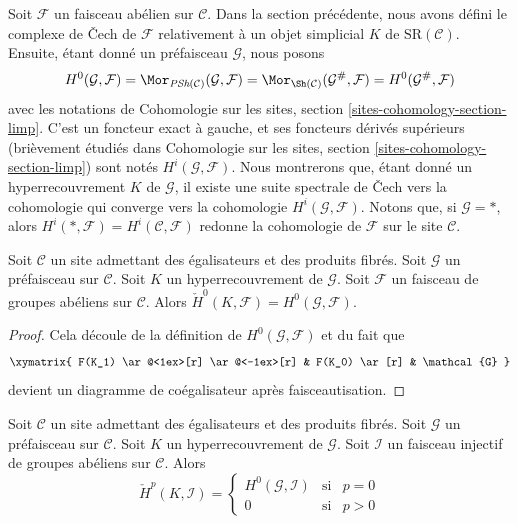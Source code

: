 \medskip\noindent
Soit $\mathcal{F}$ un faisceau abélien sur $\mathcal{C}$.
Dans la section précédente, nous avons défini le complexe de {\v C}ech de $\mathcal{F}$
relativement à un objet simplicial $K$ de $\text{SR}(\mathcal{C})$.
Ensuite, étant donné un préfaisceau $\mathcal{G}$, nous posons
$$
H^0(\mathcal{G}, \mathcal{F}) =
\Mor_{\textit{PSh}(\mathcal{C})}(\mathcal{G}, \mathcal{F}) =
\Mor_{\Sh(\mathcal{C})}(\mathcal{G}^\#, \mathcal{F}) =
H^0(\mathcal{G}^\#, \mathcal{F})
$$
avec les notations de
Cohomologie sur les sites, section \ref{sites-cohomology-section-limp}.
C'est un foncteur exact à gauche, et ses foncteurs dérivés supérieurs
(brièvement étudiés dans
Cohomologie sur les sites, section \ref{sites-cohomology-section-limp})
sont notés $H^i(\mathcal{G}, \mathcal{F})$.
Nous montrerons que, étant donné un hyperrecouvrement $K$ de $\mathcal{G}$,
il existe une suite spectrale de {\v C}ech vers la cohomologie qui converge vers la
cohomologie $H^i(\mathcal{G}, \mathcal{F})$.
Notons que, si $\mathcal{G} = *$, alors
$H^i(*, \mathcal{F}) = H^i(\mathcal{C}, \mathcal{F})$ redonne
la cohomologie de $\mathcal{F}$ sur le site $\mathcal{C}$.

\begin{lemma}
\label{lemma-h0-cech-variant}
Soit $\mathcal{C}$ un site admettant des égalisateurs et des produits fibrés.
Soit $\mathcal{G}$ un préfaisceau sur $\mathcal{C}$.
Soit $K$ un hyperrecouvrement de $\mathcal{G}$.
Soit $\mathcal{F}$ un faisceau de groupes abéliens sur $\mathcal{C}$.
Alors $\check{H}^0(K, \mathcal{F}) = H^0(\mathcal{G}, \mathcal{F})$.
\end{lemma}

\begin{proof}
Cela découle de la définition de $H^0(\mathcal{G}, \mathcal{F})$
et du fait que
$$
\xymatrix{
F(K_1) \ar@<1ex>[r] \ar@<-1ex>[r] &
F(K_0) \ar[r] & \mathcal{G}
}
$$
devient un diagramme de coégalisateur après faisceautisation.
\end{proof}

\begin{lemma}
\label{lemma-injective-trivial-cech-variant}
Soit $\mathcal{C}$ un site admettant des égalisateurs et des produits fibrés.
Soit $\mathcal{G}$ un préfaisceau sur $\mathcal{C}$.
Soit $K$ un hyperrecouvrement de $\mathcal{G}$.
Soit $\mathcal{I}$ un faisceau injectif de groupes abéliens sur $\mathcal{C}$.
Alors
$$
\check{H}^p(K, \mathcal{I}) =
\left\{
\begin{matrix}
H^0(\mathcal{G}, \mathcal{I}) & \text{si} & p = 0 \\
0 & \text{si} & p > 0
\end{matrix}
\right.
$$
\end{lemma}

